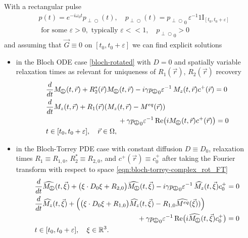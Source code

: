 \documentclass{ws-m3as}
\newcommand{\kspace}[1]{{#1}}
\renewcommand\Re{\mathrm{Re}}
\def\Mpp{M_{\perp\!\!\!\!\!\bigcirc}}
\def\Mphp{\widehat{\Mpp}}
\def\pp{p_{\perp\!\!\!\!\!\bigcirc}}
\newcommand\taup{\varepsilon}
\newcommand{\revision}[1]{{ #1}}
\newcommand{\Margin}[1]{}
\begin{document}
With a rectangular pulse 
\begin{equation}\label{pt_rect}
\begin{aligned}
&p(t)=e^{-i\omega_0t}\pp(t), \quad \pp(t)= {\pp}_0\,\taup^{-1} 1\!\mathrm{I}_{[t_0,t_0+\taup]}\\
&\text{ for some }\taup>0,\text{ typically }\taup<<1,
\quad {\pp}_0>0
\end{aligned}
\end{equation}
and assuming that ${\vec G}\equiv0$ on $[t_0,t_0+\taup]$
we can find explicit solutions 
\begin{itemize}
\item
in the Bloch ODE case \eqref{bloch-rotated} with $D=0$ and spatially variable relaxation times as relevant for uniqueness of $R_1(\vec r)$, $R_2(\vec r)$ recovery 
\begin{equation}\label{B_rect}
\begin{aligned}
&\frac{d}{dt}\Mpp(t, \vec r) +
R_2^*(\vec r) \Mpp(t, \vec r)-i\gamma\revision{{\pp}_0} \taup^{-1}\,  M_z(t, \vec r)c^+(\vec r) =0\\    
&\frac{d}{dt}M_z(t, \vec r)  
+R_1(\vec r) (M_z(t, \vec r)-M^{eq}(\vec r))\\
&\hspace*{3.6cm}+\gamma\revision{{\pp}_0} \taup^{-1}\, \Re\bigl(i\Mpp(t, \vec r)c^+(\vec r)\bigr)=0\\
&t\in[t_0,t_0+\taup], \quad \vec r\in\Omega, 
\end{aligned}
\end{equation}
\Margin{R1 B.}
\item
\kspace{
in the Bloch-Torrey PDE case with 
constant diffusion $D\equiv D_0$, relaxation times $R_1\equiv R_{1,0}$, $R_2^*\equiv R_{2,0}$, and $c^+(\vec r)\equiv c^+_0$ after taking the Fourier transform with respect to space \eqref{eqn:bloch-torrey-complex_rot_FT}
\begin{equation}\label{BT0_rect}
\begin{aligned}
&\frac{d}{dt}\Mphp(t, \vec\xi) 
+\bigl(\xi\cdot D_0\xi +R_{2,0}\bigr)\Mphp(t, \vec\xi)
-i\gamma\revision{{\pp}_0} \taup^{-1}\,  \widehat{M_z}(t, \vec\xi)c^+_0 =0\\    
&\frac{d}{dt}\widehat{M_z}(t, \vec\xi) 
+\Bigl(\bigl(\xi\cdot D_0\xi +R_{1,0}\bigr)\widehat{M_z}(t, \vec\xi)-R_{1,0}\widehat{M^{eq}}(\vec\xi))\Bigr)\\
&\hspace*{5.1cm}+\gamma\revision{{\pp}_0} \taup^{-1}\, \Re\bigl(i\Mphp(t, \vec\xi)c^+_0\bigr)=0\\
&t\in[t_0,t_0+\taup], \quad \xi\in\mathbb{R}^3.
\end{aligned}
\end{equation}
}
\end{itemize}  
\end{document}
